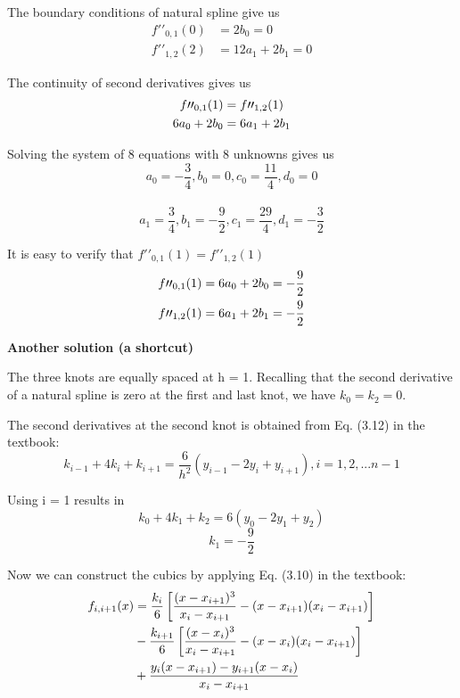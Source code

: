 \begin{exercise}{4}
The boundary conditions of natural spline give us
\begin{align}
f\prime\prime_{0,1}(0) &= 2b_0 = 0\\
f\prime\prime_{1,2}(2) &= 12a_1 + 2b_1 = 0
\end{align}

The continuity of second derivatives gives us
\begin{align}
\notag
f\prime\prime_{0,1}(1) &= f\prime\prime_{1,2}(1)\\
 6a_0 + 2b_0 &= 6a_1 + 2b_1
\end{align}

Solving the system of 8 equations with 8 unknowns gives us \\
$$a_0=-\frac{3}{4},b_0=0,c_0=\frac{11}{4},d_0=0$$\\
$$a_1=\frac{3}{4},b_1=-\frac{9}{2},c_1=\frac{29}{4},d_1=-\frac{3}{2}$$

It is easy to verify that $f\prime\prime_{0,1}(1) = f\prime\prime_{1,2}(1)$
\begin{align}
\notag
f\prime\prime_{0,1}(1) &= 6a_0 + 2b_0 = -\frac{9}{2}\\
\notag
f\prime\prime_{1,2}(1) &= 6a_1 + 2b_1 = -\frac{9}{2}
\end{align}

\textbf{Another solution (a shortcut)}

The three knots are equally spaced at h = 1. Recalling that the second
derivative of a natural spline is zero at the first and last knot, we have $k_0 = k_2 = 0$. 

The second derivatives at the second knot is obtained from Eq. (3.12) in the textbook:
$$k_{i-1}+4k_i+k_{i+1}=\frac{6}{h^2}(y_{i-1}-2y_i+y_{i+1}), i=1,2,...n-1$$

Using i = 1 results in
$$k_0+4k_1+k_2=6(y_0-2y_1+y_2)$$
$$k_1=-\frac{9}{2}$$

Now we can construct the cubics by applying Eq. (3.10) in the textbook:
\begin{align}
\notag
f_{i,i+1}(x) &= \frac{k_i}{6}\left[\frac{(x-x_{i+1})^3}{x_i-x_{i+1}}-(x-x_{i+1})(x_i-x_{i+1})\right]\\ 
\notag
& - \frac{k_{i+1}}{6}\left[\frac{(x-x_i)^3}{x_i-x_{i+1}}-(x-x_i)(x_i-x_{i+1})\right]\\ 
\notag
& + \frac{y_i(x-x_{i+1})-y_{i+1}(x-x_i)}{x_i-x_{i+1}}
\end{align}


\end{exercise}

